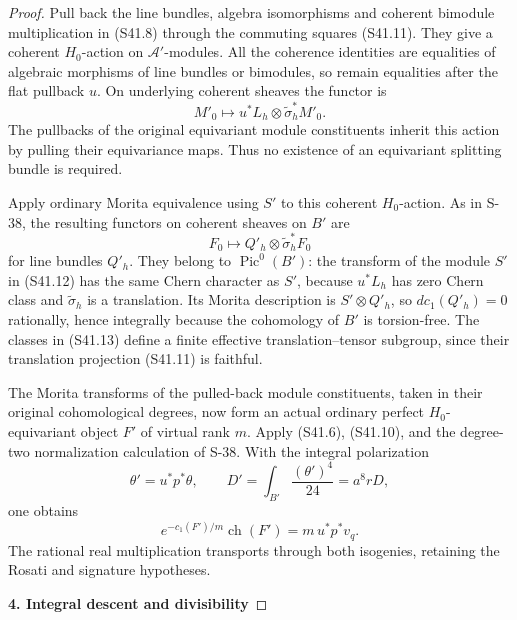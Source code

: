 \begin{proof}
Pull back the line bundles, algebra isomorphisms and coherent bimodule multiplication in (S41.8) through the commuting squares (S41.11). They give a coherent \(H_0\)-action on \(\mathscr A'\)-modules. All the coherence identities are equalities of algebraic morphisms of line bundles or bimodules, so remain equalities after the flat pullback \(u\). On underlying coherent sheaves the functor is \[
 M'_0\longmapsto u^*L_h\otimes\widetilde\sigma_h^*M'_0.
 \tag{S41.12}
\] The pullbacks of the original equivariant module constituents inherit this action by pulling their equivariance maps. Thus no existence of an equivariant splitting bundle is required.

Apply ordinary Morita equivalence using \(S'\) to this coherent \(H_0\)-action. As in S-38, the resulting functors on coherent sheaves on \(B'\) are \[
 F_0\longmapsto Q'_h\otimes\widetilde\sigma_h^*F_0
 \tag{S41.13}
\] for line bundles \(Q'_h\). They belong to \(\operatorname{Pic}^0(B')\): the transform of the module \(S'\) in (S41.12) has the same Chern character as \(S'\), because \(u^*L_h\) has zero Chern class and \(\widetilde\sigma_h\) is a translation. Its Morita description is \(S'\otimes Q'_h\), so \(d c_1(Q'_h)=0\) rationally, hence integrally because the cohomology of \(B'\) is torsion-free. The classes in (S41.13) define a finite effective translation--tensor subgroup, since their translation projection (S41.11) is faithful.

The Morita transforms of the pulled-back module constituents, taken in their original cohomological degrees, now form an actual ordinary perfect \(H_0\)-equivariant object \(F'\) of virtual rank \(m\). Apply (S41.6), (S41.10), and the degree-two normalization calculation of S-38. With the integral polarization \[
 \theta'=u^*p^*\theta,\qquad
 D'=\int_{B'}\frac{(\theta')^4}{24}=a^8rD,
\] one obtains \[
 e^{-c_1(F')/m}\operatorname{ch}(F')=m\,u^*p^*v_q.
 \tag{S41.14}
\] The rational real multiplication transports through both isogenies, retaining the Rosati and signature hypotheses.

\par

\medskip\noindent\textbf{4. Integral descent and divisibility}\quad


\end{proof}
